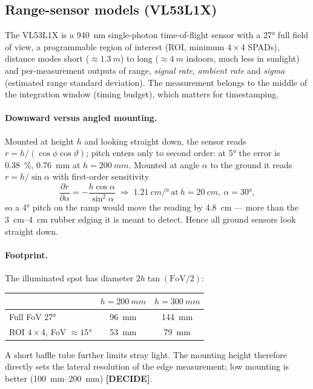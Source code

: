 \documentclass[11pt,a4paper]{article}
\newcommand{\mk}[2]{\textsf{\scriptsize\bfseries\colorbox{#1bg}{\color{#1}[#2]}}}
\newcommand{\DECIDE}{\mk{accent}{DECIDE}}
\begin{document}
\subsection{Range-sensor models (VL53L1X)}\label{sec:tofmodel}

The VL53L1X is a \qty{940}{nm} single-photon time-of-flight sensor with a
\ang{27} full field of view, a programmable region of interest (ROI, minimum
$4\times4$ SPADs), distance modes short ($\approx\qty{1.3}{m}$) to long
($\approx\qty{4}{m}$ indoors, much less in sunlight) and per-measurement outputs
of range, \emph{signal rate}, \emph{ambient rate} and \emph{sigma} (estimated
range standard deviation). The measurement belongs to the middle of the
integration window (timing budget), which matters for timestamping.

\paragraph{Downward versus angled mounting.} Mounted at height $h$ and looking
straight down, the sensor reads $r=h/(\cos\phi\cos\vartheta)$; pitch enters
only to second order: at \ang{5} the error is \qty{0.38}{\percent},
\qty{0.76}{mm} at $h=\qty{200}{mm}$. Mounted at angle $\alpha$ to the ground it
reads $r=h/\sin\alpha$ with first-order sensitivity
\begin{equation}
\frac{\partial r}{\partial\alpha}=-\frac{h\cos\alpha}{\sin^2\alpha}
\;\Rightarrow\; \qty{1.21}{cm/\degree}\ \text{at}\ h=\qty{20}{cm},\ \alpha=\ang{30},
\end{equation}
so a \ang{4} pitch on the ramp would move the reading by \qty{4.8}{cm} --- more
than the \qtyrange{3}{4}{cm} rubber edging it is meant to detect. Hence all
ground sensors look straight down.

\paragraph{Footprint.} The illuminated spot has diameter $2h\tan(\mathrm{FoV}/2)$:
\begin{center}
\small
\begin{tabular}{@{}lcc@{}}
\toprule
& $h=\qty{200}{mm}$ & $h=\qty{300}{mm}$\\
\midrule
Full FoV \ang{27} & \qty{96}{mm} & \qty{144}{mm}\\
ROI $4\times4$, FoV $\approx\ang{15}$ & \qty{53}{mm} & \qty{79}{mm}\\
\bottomrule
\end{tabular}
\end{center}
A short baffle tube further limits stray light. The mounting height therefore
directly sets the lateral resolution of the edge measurement; low mounting is
better (\qtyrange{100}{200}{mm}) \DECIDE.
\end{document}
